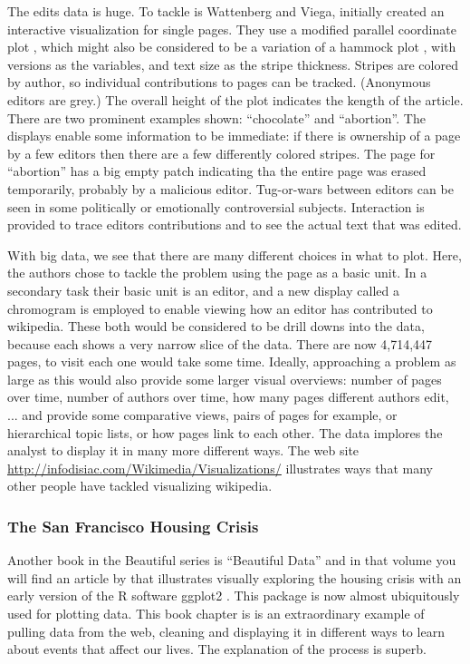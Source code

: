 \documentclass{article}
\begin{document}
The edits data is huge. To tackle is Wattenberg and Viega, initially created an interactive visualization for single pages. They use a modified parallel coordinate plot \citep{In85,We90}, which might also be considered to be a variation of a hammock plot \citep{hammock,ggparallel}, with versions as the variables, and text size as the stripe thickness. Stripes are colored by author, so individual contributions to pages can be tracked. (Anonymous editors are grey.) The overall height of the plot indicates the kength of the article. There are two prominent examples shown: ``chocolate'' and ``abortion''. The displays enable some information to be immediate: if there is ownership of a page by a few editors then there are a few differently colored stripes. The page for ``abortion'' has a big empty patch indicating tha the entire page was erased temporarily, probably by a malicious editor. Tug-or-wars between editors can be seen in some politically or emotionally controversial subjects. Interaction is provided to trace editors contributions and to see the actual text that was edited. 

With big data, we see that there are many different choices in what to plot. Here, the authors chose to tackle the problem using the page as a basic unit. In a secondary task their basic unit is an editor, and a new display called a chromogram is employed to enable viewing how an editor has contributed to wikipedia.  These both would be considered to be drill downs into the data, because each shows a very narrow slice of the data. There are now 4,714,447 pages, to visit each one would take some time. Ideally, approaching a problem as large as this would also provide some larger visual overviews: number of pages over time, number of authors over time, how many pages different authors edit, ... and provide some comparative views, pairs of pages for example, or hierarchical topic lists, or how pages link to each other. The data implores the analyst to display it in many more different ways. The web site \url{http://infodisiac.com/Wikimedia/Visualizations/} illustrates ways that many other people have tackled visualizing wikipedia.

\subsubsection{The San Francisco Housing Crisis}

Another book in the Beautiful series is ``Beautiful Data'' and in that volume you will find an article by \citet{SFHousing} that illustrates visually exploring the housing crisis with an early version of the R software ggplot2 \citep{wickham2009ggplot2}. This package is now almost ubiquitously used for plotting data. This book chapter is is an extraordinary example of pulling data from the web, cleaning and displaying it in different ways to learn about events that affect our lives. The explanation of the process is superb. 
\end{document}
